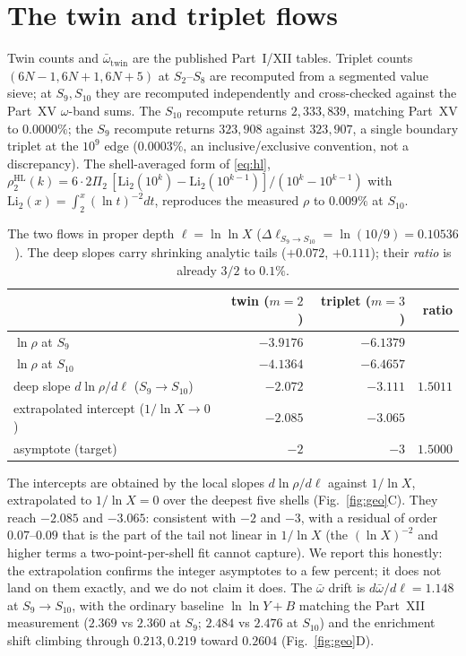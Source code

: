 \documentclass[11pt]{article}
\begin{document}
\section{The twin and triplet flows}

Twin counts and $\bar\omega_{\mathrm{twin}}$ are the published Part~I/XII tables.
Triplet counts $(6N-1,6N+1,6N+5)$ at $S_2$--$S_8$ are recomputed from a segmented
value sieve; at $S_9,S_{10}$ they are recomputed independently and cross-checked
against the Part~XV $\omega$-band sums. The $S_{10}$ recompute returns
$2{,}333{,}839$, matching Part~XV to $0.0000\%$; the $S_9$ recompute returns
$323{,}908$ against $323{,}907$, a single boundary triplet at the $10^9$ edge
($0.0003\%$, an inclusive/exclusive convention, not a discrepancy). The
shell-averaged form of \eqref{eq:hl},
$\rho_2^{\mathrm{HL}}(k)=6\cdot2\Pi_2\,[\mathrm{Li}_2(10^k)-\mathrm{Li}_2(10^{k-1})]
/(10^k-10^{k-1})$ with $\mathrm{Li}_2(x)=\int_2^x(\ln t)^{-2}dt$, reproduces the
measured $\rho$ to $0.009\%$ at $S_{10}$.

\begin{table}[h]\centering\small
\begin{tabular}{lrrr}
\toprule
 & twin ($m=2$) & triplet ($m=3$) & ratio\\
\midrule
$\ln\rho$ at $S_9$         & $-3.9176$ & $-6.1379$ & \\
$\ln\rho$ at $S_{10}$      & $-4.1364$ & $-6.4657$ & \\
deep slope $d\ln\rho/d\ell$ ($S_9\!\to\!S_{10}$) & $-2.072$ & $-3.111$ & $1.5011$\\
extrapolated intercept ($1/\ln X\to0$) & $-2.085$ & $-3.065$ & \\
asymptote (target)        & $-2$ & $-3$ & $1.5000$\\
\bottomrule
\end{tabular}
\caption{The two flows in proper depth $\ell=\ln\ln X$
($\Delta\ell_{S_9\to S_{10}}=\ln(10/9)=0.10536$). The deep slopes carry shrinking
analytic tails ($+0.072$, $+0.111$); their \emph{ratio} is already $3/2$ to
$0.1\%$.}
\label{tab:flow}
\end{table}

The intercepts are obtained by the local slopes $d\ln\rho/d\ell$ against $1/\ln X$,
extrapolated to $1/\ln X=0$ over the deepest five shells (Fig.~\ref{fig:geo}C).
They reach $-2.085$ and $-3.065$: consistent with $-2$ and $-3$, with a residual
of order $0.07$--$0.09$ that is the part of the tail not linear in $1/\ln X$ (the
$(\ln X)^{-2}$ and higher terms a two-point-per-shell fit cannot capture). We
report this honestly: the extrapolation confirms the integer asymptotes to a few
percent; it does not land on them exactly, and we do not claim it does. The
$\bar\omega$ drift is $d\bar\omega/d\ell=1.148$ at $S_9\!\to\!S_{10}$, with the
ordinary baseline $\ln\ln Y+B$ matching the Part~XII measurement ($2.369$ vs
$2.360$ at $S_9$; $2.484$ vs $2.476$ at $S_{10}$) and the enrichment shift
climbing through $0.213,0.219$ toward $0.2604$ (Fig.~\ref{fig:geo}D).
\end{document}
